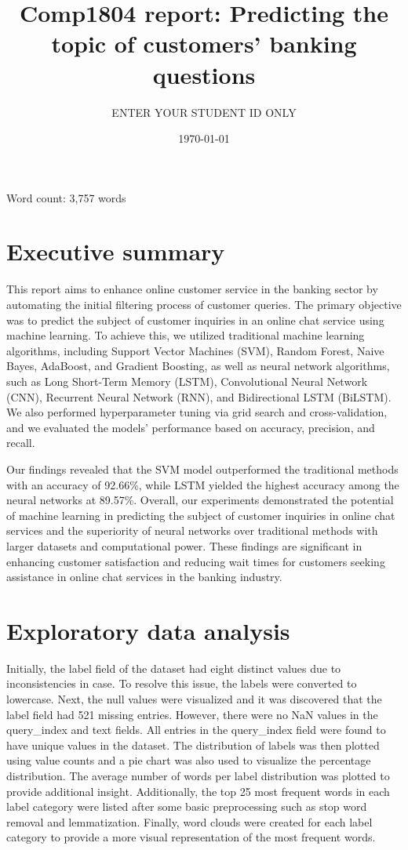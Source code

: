 \documentclass[12pt, a4paper]{article}
\title{Comp1804 report: Predicting the topic of customers’ banking questions}
\author{ENTER YOUR STUDENT ID ONLY }
\date{\today{}}
\begin{document}
\maketitle

Word count: 3,757 words  


\section*{Executive summary}
This report aims to enhance online customer service in the banking sector by automating the initial filtering process of customer queries. The primary objective was to predict the subject of customer inquiries in an online chat service using machine learning. \newline
To achieve this, we utilized traditional machine learning algorithms, including Support Vector Machines (SVM), Random Forest, Naive Bayes, AdaBoost, and Gradient Boosting, as well as neural network algorithms, such as Long Short-Term Memory (LSTM), Convolutional Neural Network (CNN), Recurrent Neural Network (RNN), and Bidirectional LSTM (BiLSTM). We also performed hyperparameter tuning via grid search and cross-validation, and we evaluated the models' performance based on accuracy, precision, and recall.

Our findings revealed that the SVM model outperformed the traditional methods with an accuracy of 92.66\%, while LSTM yielded the highest accuracy among the neural networks at 89.57\%. \newline
Overall, our experiments demonstrated the potential of machine learning in predicting the subject of customer inquiries in online chat services and the superiority of neural networks over traditional methods with larger datasets and computational power. These findings are significant in enhancing customer satisfaction and reducing wait times for customers seeking assistance in online chat services in the banking industry.

\section{Exploratory data analysis}
Initially, the label field of the dataset had eight distinct values due to inconsistencies in case. To resolve this issue, the labels were converted to lowercase. Next, the null values were visualized and it was discovered that the label field had 521 missing entries. However, there were no NaN values in the query\_index and text fields. 
All entries in the query\_index field were found to have unique values in the dataset. \newline
The distribution of labels was then plotted using value counts and a pie chart was also used to visualize the percentage distribution. \newline
The average number of words per label distribution was plotted to provide additional insight.
Additionally, the top 25 most frequent words in each label category were listed after some basic preprocessing such as stop word removal and lemmatization.
Finally, word clouds were created for each label category to provide a more visual representation of the most frequent words.
\end{document}

